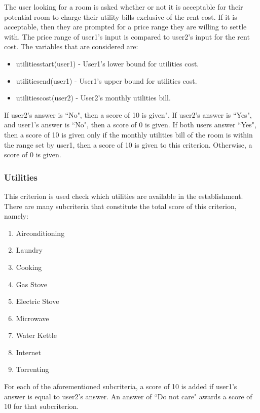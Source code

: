 \documentclass[journal]{./IEEE/IEEEtran}
\begin{document}
        The user looking for a room is asked whether or not it is acceptable for their potential room to charge their
        utility bills exclusive of the rent cost. If it is acceptable, then they are prompted for a price range they are
        willing to settle with.  The price range of user1's input is compared to user2's input for the rent cost. The
        variables that are considered are:
        \begin{itemize}
            \item utilities\textunderscore start(user1) - User1's lower bound for utilities cost.
            \item utilities\textunderscore end(user1) -  User1's upper bound for utilities cost.
            \item utilities\textunderscore cost(user2) - User2's monthly utilities bill.
        \end{itemize}
        If user2's answer is ``No", then a score of 10 is given".
        If user2's answer is ``Yes", and user1's answer is ``No", then a score of 0 is given.
        If both users answer ``Yes", then a score of 10 is given only if the monthly utilities bill of the room is
        within the range set by user1, then a score of 10 is given to this criterion.
        Otherwise, a score of 0 is given.

    \subsubsection{Utilities}
        This criterion is used check which utilities are available in the establishment. There are many subcriteria that
        constitute the total score of this criterion, namely:
        \begin{enumerate}
            \item Airconditioning
            \item Laundry
            \item Cooking
            \item Gas Stove
            \item Electric Stove
            \item Microwave
            \item Water Kettle
            \item Internet
            \item Torrenting
        \end{enumerate}

        For each of the aforementioned subcriteria, a score of 10 is added if user1's answer is equal to user2's answer.
        An answer of ``Do not care" awards a score of 10 for that subcriterion.
\end{document}
